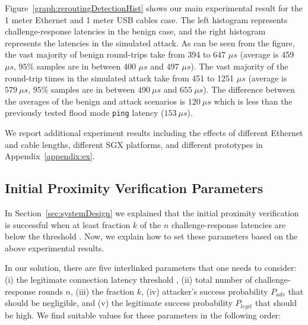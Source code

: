 Figure~\ref{graph:reroutingDetectionHist} shows our main experimental result for the 1 meter Ethernet and 1 meter USB cables case. The left histogram represents challenge-response latencies in the benign case, and the right histogram represents the latencies in the simulated attack. As can be seen from the figure, the vast majority of benign round-trips take from 394 to 647 $\mu s$ (average is 459 $\mu s$, $95\%$ samples are in between 400 $\mu s$ and 497 $\mu s$). The vast majority of the round-trip times in the simulated attack take from 451 to 1251 $\mu s$ (average is $579\ \mu s$, $95\%$ samples are in between $490\ \mu s$ and $655\ \mu s$).
%
The difference between the averages of the benign and attack scenarios is $120\ \mu s$ which is less than the previously tested flood mode \texttt{ping} latency ($153\ \mu s$). 

We report additional experiment results including the effects of different Ethernet and \usb cable lengths, different SGX platforms, and different \device{} prototypes in Appendix~\ref{appendix:ex}.

\subsection{Initial Proximity Verification Parameters}
\label{sec:evaluation:parameters}

In Section~\ref{sec:systemDesign} we explained that the initial proximity verification is successful when at least fraction $k$ of the $n$ challenge-response latencies are below the threshold \connect.  Now, we explain how to set these parameters based on the above experimental results.

In our solution, there are five interlinked parameters that one needs to consider: (i) the legitimate connection latency threshold \connect, (ii) total number of challenge-response rounds $n$, (iii) the fraction $k$, (iv) attacker's success probability $P_{adv}$ that should be negligible, and (v) the legitimate success probability $P_{legit}$ that should be high. We find suitable values for these parameters in the following order:

